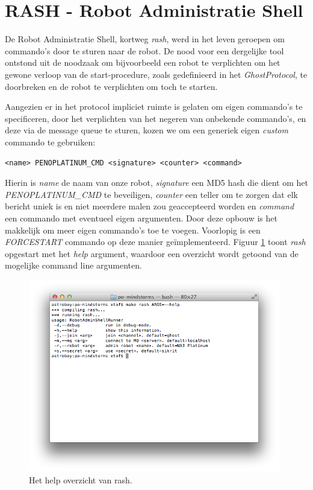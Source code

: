 \documentclass[12pt,a4paper]{report}
\begin{document}
\section{RASH - Robot Administratie Shell}

De Robot Administratie Shell, kortweg \emph{rash}, werd in het leven geroepen om commando's door te sturen naar de robot. De nood voor een dergelijke tool ontstond uit de noodzaak om bijvoorbeeld een robot te verplichten om het gewone verloop van de start-procedure, zoals gedefinieerd in het \emph{GhostProtocol}, te doorbreken en de robot te verplichten om toch te starten.

Aangezien er in het protocol impliciet ruimte is gelaten om eigen commando's te specificeren, door het verplichten van het negeren van onbekende commando's, en deze via de message queue te sturen, kozen we om een generiek eigen \emph{custom} commando te gebruiken:

\begin{center}
{\tt <name> PENOPLATINUM\_CMD <signature> <counter> <command>}
\end{center}

Hierin is \emph{name} de naam van onze robot, \emph{signature} een MD5 hash die dient om het \emph{PENOPLATINUM\_CMD} te beveiligen, \emph{counter} een teller om te zorgen dat elk bericht uniek is en niet meerdere malen zou geaccepteerd worden en \emph{command} een commando met eventueel eigen argumenten. Door deze opbouw is het makkelijk om meer eigen commando's toe te voegen. Voorlopig is een \emph{FORCESTART} commando op deze manier ge\"implementeerd. Figuur \ref{fig:rash_help} toont \emph{rash} opgestart met het \emph{help} argument, waardoor een overzicht wordt getoond van de mogelijke command line argumenten. 

\begin{figure}[htbp]
  \centering
  \includegraphics[width=110mm]{resources/rash_help.png}
  \caption{Het help overzicht van rash.}
  \label{fig:rash_help}
\end{figure}
\end{document}
